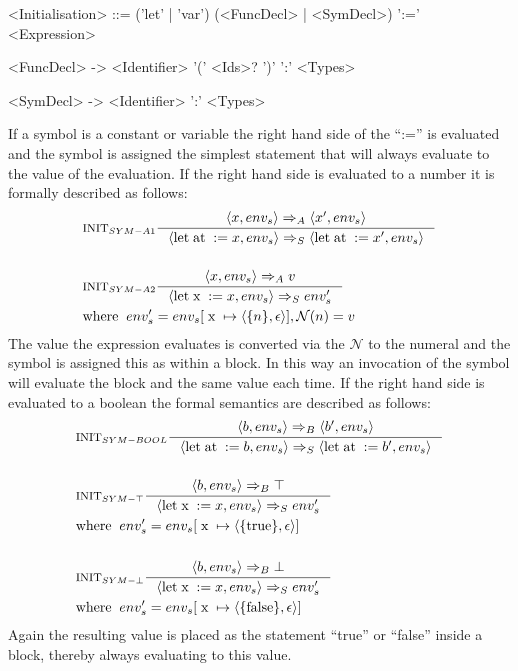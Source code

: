 \begin{grammar}
<Initialisation> ::= ('let' | 'var') (<FuncDecl> | <SymDecl>) ':=' <Expression>

<FuncDecl> -> <Identifier> '(' <Ids>? ')' ':' <Types>

<SymDecl> -> <Identifier> ':' <Types>
\end{grammar}
If a symbol is a constant or variable the right hand side of the \enquote{:=} is evaluated and the symbol is assigned the simplest statement that will always evaluate to the value of the evaluation. If the right hand side is evaluated to a number it is formally described as follows:
\begin{align*}
&\inference[$\text{INIT}_{SYM-A1}$]{\Braket{x,env_s} \Rightarrow_A \Braket{x',env_s}}
                         {\Braket{\Tlet \Tat := x,env_s} \Rightarrow_S \Braket{\Tlet \Tat := x',env_s}}
\\\\
&\inference[$\text{INIT}_{SYM-A2}$]{\Braket{x,env_s} \Rightarrow_A v}
                         {\Braket{\Tlet \Tx := x,env_s} \Rightarrow_S env_s'}
\\
&{\Twhere env_s' = env_{s}[\Tx \mapsto \Braket{\{n\},\epsilon}], \mathcal{N}(n) = v}
\end{align*}
The value the expression evaluates is converted via the $\mathcal{N}$ to the numeral and the symbol is assigned this as within a block. In this way an invocation of the symbol will evaluate the block and the same value each time. If the right hand side is evaluated to a boolean the formal semantics are described as follows:
\begin{align*}
&\inference[$\text{INIT}_{SYM-BOOL}$]{\Braket{b,env_s} \Rightarrow_B \Braket{b',env_s}}
                         {\Braket{\Tlet \Tat := b,env_s} \Rightarrow_S \Braket{\Tlet \Tat := b',env_s}}
\\\\
&\inference[$\text{INIT}_{SYM-\top}$]{\Braket{b,env_s} \Rightarrow_B \top}
                         {\Braket{\Tlet \Tx := x,env_s} \Rightarrow_S env_s'}
\\
&{\Twhere env_s' = env_{s}[\Tx \mapsto \Braket{\{\Ttrue\},\epsilon}]}
\\\\
&\inference[$\text{INIT}_{SYM-\bot}$]{\Braket{b,env_s} \Rightarrow_B \bot}
                         {\Braket{\Tlet \Tx := x,env_s} \Rightarrow_S env_s'}
\\
&{\Twhere env_s' = env_{s}[\Tx \mapsto \Braket{\{\Tfalse\},\epsilon}]}
\end{align*}
Again the resulting value is placed as the statement \enquote{true} or \enquote{false} inside a block, thereby always evaluating to this value.

